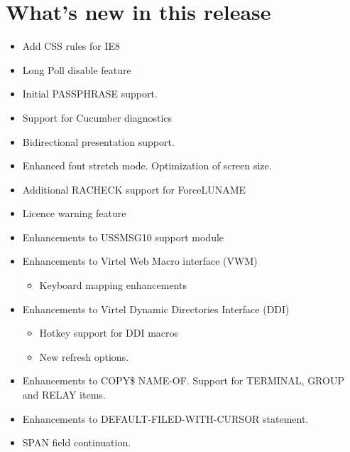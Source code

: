 \documentclass[letterpaper,10pt,english]{sphinxmanual}
\begin{document}
\chapter{What’s new in this release}
\label{\detokenize{Migration_Guide:what-s-new-in-this-release}}\label{\detokenize{Migration_Guide:index-9}}
\begin{itemize}
\item {} 
Add CSS rules for IE8

\item {} 
Long Poll disable feature

\item {} 
Initial PASSPHRASE support.

\item {} 
Support for Cucumber diagnostics

\item {} 
Bidirectional presentation support.

\item {} 
Enhanced font stretch mode. Optimization of screen size.

\item {} 
Additional RACHECK support for ForceLUNAME

\item {} 
Licence warning feature

\item {} 
Enhancements to USSMSG10 support module

\item {} 
Enhancements to Virtel Web Macro interface (VWM)
\begin{itemize}
\item {} 
Keyboard mapping enhancements

\end{itemize}

\item {} 
Enhancements to Virtel Dynamic Directories Interface (DDI)
\begin{itemize}
\item {} 
Hotkey support for DDI macros

\item {} 
New refresh options.

\end{itemize}

\end{itemize}

\begin{itemize}
\item {} 
Enhancements to COPY\$ NAME-OF. Support for TERMINAL, GROUP and RELAY items.

\item {} 
Enhancements to DEFAULT-FILED-WITH-CURSOR statement.

\item {} 
SPAN field continuation.

\end{itemize}
\end{document}
